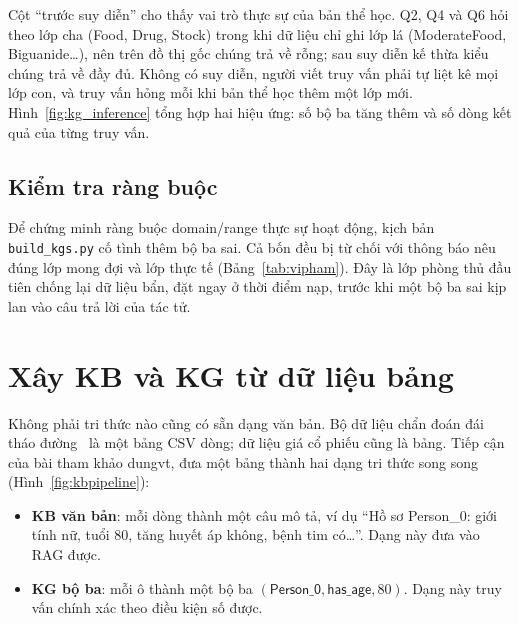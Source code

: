 

Cột ``trước suy diễn'' cho thấy vai trò thực sự của bản thể học. Q2, Q4 và Q6 hỏi theo lớp cha (\textsf{Food},
\textsf{Drug}, \textsf{Stock}) trong khi dữ liệu chỉ ghi lớp lá (\textsf{ModerateFood}, \textsf{Biguanide}\dots),
nên trên đồ thị gốc chúng trả về rỗng; sau suy diễn kế thừa kiểu chúng trả về đầy đủ. Không có suy diễn, người
viết truy vấn phải tự liệt kê mọi lớp con, và truy vấn hỏng mỗi khi bản thể học thêm một lớp mới.
Hình~\ref{fig:kg_inference} tổng hợp hai hiệu ứng: số bộ ba tăng thêm và số dòng kết quả của từng truy vấn.


\subsection{Kiểm tra ràng buộc}\label{sec:rangbuoc}
Để chứng minh ràng buộc domain/range thực sự hoạt động, kịch bản \texttt{build\_kgs.py} cố tình thêm
 bộ ba sai. Cả bốn đều bị từ chối với thông báo nêu đúng lớp mong đợi và lớp thực tế
(Bảng~\ref{tab:vipham}). Đây là lớp phòng thủ đầu tiên chống lại dữ liệu bẩn, đặt ngay ở thời điểm nạp, trước
khi một bộ ba sai kịp lan vào câu trả lời của tác tử.


\section{Xây KB và KG từ dữ liệu bảng}
Không phải tri thức nào cũng có sẵn dạng văn bản. Bộ dữ liệu chẩn đoán đái tháo đường~\cite{mustafa2023diabetes}
là một bảng CSV  dòng; dữ liệu giá cổ phiếu cũng là bảng. Tiếp cận của bài
tham khảo dungvt, đưa một bảng thành hai dạng tri thức song song (Hình~\ref{fig:kbpipeline}):

\begin{itemize}
  \item \textbf{KB văn bản}: mỗi dòng thành một câu mô tả, ví dụ ``Hồ sơ Person\_0: giới tính nữ, tuổi 80, tăng
        huyết áp không, bệnh tim có\dots''. Dạng này đưa vào RAG được.
  \item \textbf{KG bộ ba}: mỗi ô thành một bộ ba $(\textsf{Person\_0}, \textsf{has\_age}, 80)$. Dạng này truy vấn
        chính xác theo điều kiện số được.
\end{itemize}

